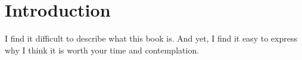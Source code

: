

\part*{Introduction}


I find it difficult to describe what this book is. And yet, I find it easy to express why I think it is worth your time and contemplation.



